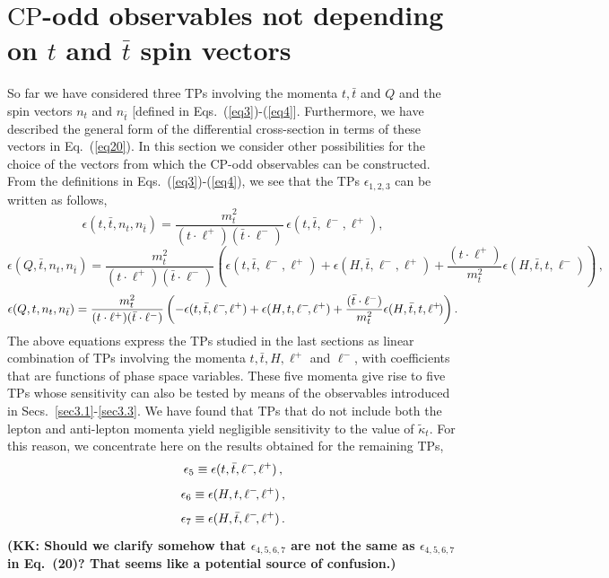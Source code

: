 \documentclass[aps,preprint,tightenlines,floatfix,superscriptaddress,nofootinbib,showpacs]{revtex4-1}
\def\beq{\begin{equation}}
\def\eeq{\end{equation}}
\def\tbar{\bar{t}}
\def\kpt{\tilde{\kappa}_t}
\def\TPa{\epsilon(t,\tbar,n_t,n_{\tbar})}
\def\TPb{\epsilon(Q,\tbar,n_t,n_{\tbar})}
\def\TPc{\epsilon(Q,t,n_t,n_{\tbar})}
\begin{document}
\section{{\boldmath $\mathrm{CP}$}-odd observables not depending on \MakeLowercase{{\boldmath $t$}} and \MakeLowercase{{\boldmath $\tbar$}} spin vectors}
\label{sec4}
So far we have considered three TPs involving the momenta $t,\tbar$
and $Q$ and the spin vectors $n_t$ and $n_{\tbar}$ [defined in
Eqs.~(\ref{eq3})-(\ref{eq4}].  Furthermore, we have described the general
form of the differential cross-section in terms of these vectors in
Eq.~(\ref{eq20}). In this section we consider other
possibilities for the choice of the vectors from which the
$\mathrm{CP}$-odd observables can be constructed. From the definitions
in Eqs.~(\ref{eq3})-(\ref{eq4}), we see that the TPs
$\epsilon_{1,2,3}$ can be written as follows,
%
\beq
\label{eq29}
\TPa = \frac{m^2_t}{(t\cdot \ell^+)(\tbar\cdot \ell^-)}\,\epsilon(t,\tbar,\ell^-\!,\ell^+),
\eeq
%
\vspace*{1mm}
\beq
\label{eq30}
\TPb = \frac{m^2_t}{(t\cdot \ell^+)(\tbar\cdot \ell^-)}\left(\epsilon(t,\tbar,\ell^-\!,\ell^+)+\epsilon(H,\tbar,\ell^-\!,\ell^+)+\frac{(t\cdot\ell^+)}{m^2_t}\epsilon(H,\tbar,t,\ell^-\!)\right) \,,
\eeq
%
\vspace*{1mm}
\beq
\label{eq31}
\TPc = \frac{m^2_t}{(t\cdot \ell^+)(\tbar\cdot \ell^-)}\left(-\epsilon(t,\tbar,\ell^-\!,\ell^+)+\epsilon(H,t,\ell^-\!,\ell^+)+\frac{(\tbar\cdot\ell^-)}{m^2_t}\epsilon(H,\tbar,t,\ell^+\!)\right).
\vspace*{2mm}
\eeq
%
The above equations express the TPs studied in the last sections as
linear combination of TPs involving the momenta $t,\tbar,H,\ell^+$ and
$\ell^-$, with coefficients that are functions of phase space
variables. These five momenta give rise to five TPs whose sensitivity
can also be tested by means of the observables introduced in
Secs.~\ref{sec3.1}-\ref{sec3.3}.  We have found
that TPs that do not include both the lepton and anti-lepton momenta yield
negligible sensitivity to the value of $\kpt$.  For this reason,
we concentrate here on the
results obtained for the remaining TPs,
%
\beq
\label{eqa5}
\epsilon_5\equiv\epsilon(t,\tbar,\ell^-\!,\ell^+) \,,
\vspace*{1mm}
\eeq
%
\beq
\label{eqa6}
\epsilon_6\equiv\epsilon(H,t,\ell^-\!,\ell^+) \,,
\vspace*{1mm}
\eeq
%
\beq
\label{eqa7}
\epsilon_7\equiv\epsilon(H,\tbar,\ell^-\!,\ell^+) \,.
\vspace*{1mm}
\eeq
%
    {\bf (KK: Should we clarify somehow that $\epsilon_{4,5,6,7}$ are not the same as
      $\epsilon_{4,5,6,7}$ in Eq.~(20)?  That seems like a potential source of confusion.)}
\end{document}
